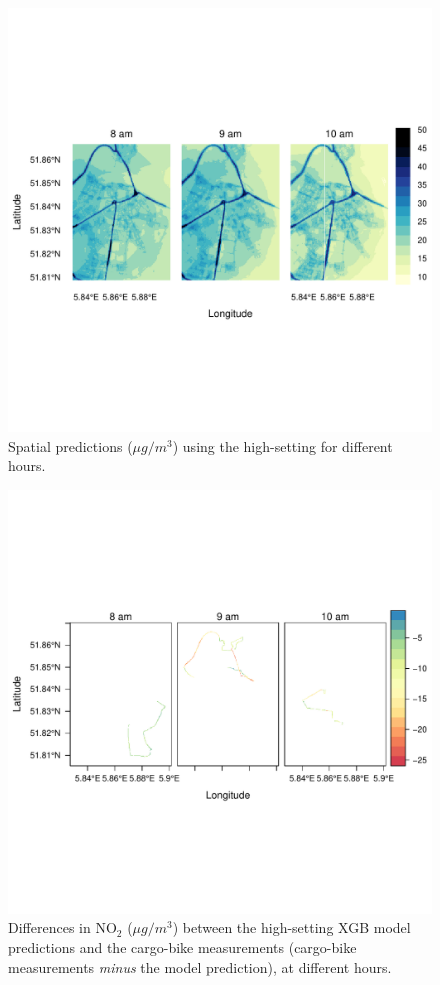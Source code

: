 \documentclass{article}
\begin{document}
\begin{figure}[H]
    \includegraphics[width=\linewidth, trim=1cm 4cm 0cm 1cm, clip=true]{xgbhs.pdf}
    
    \caption {Spatial predictions ($\mu g/m^3$) using the high-setting for different hours.  }
    \label{xgbhs}
\end{figure}

\begin{figure}[H]
    \includegraphics[width=\linewidth, trim=1cm 4cm 0cm 1cm, clip=true]{diffsgbhs.pdf}
    
    \caption {Differences in NO$_2$ ($\mu g/m^3$) between the high-setting XGB model predictions and the cargo-bike measurements (cargo-bike measurements \textit{minus} the model prediction), at different hours. }
    \label{diffxgbhs}
\end{figure}
\end{document}
